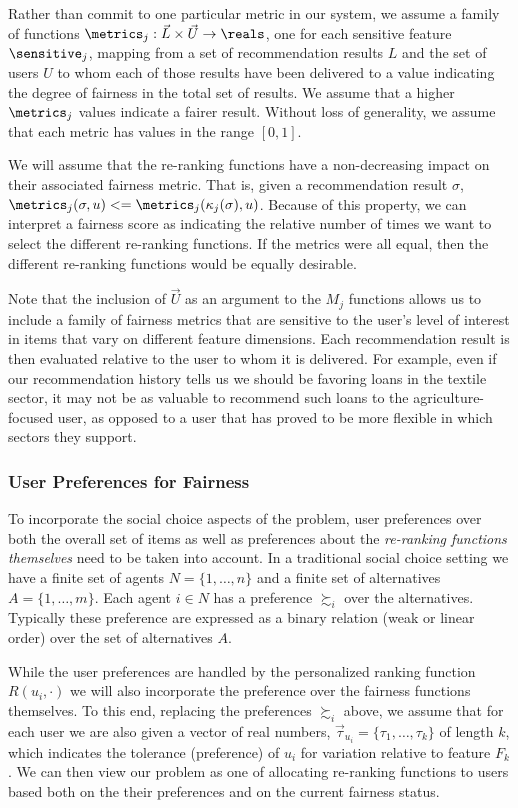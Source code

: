 Rather than commit to one particular metric in our system, we assume a family of functions $\metrics_j: \vec{L} \times \vec{U} \rightarrow \reals$, one for each sensitive feature $\sensitive_j$, mapping from a set of recommendation results $L$ and the set of users $U$ to whom each of those results have been delivered to a value indicating the degree of fairness in the total set of results. We assume that a higher $\metrics_j$ values indicate a fairer result. Without loss of generality, we assume that each metric has values in the range $[0,1]$.

We will assume that the re-ranking functions have a non-decreasing impact on their associated fairness metric. That is, given a recommendation result $\sigma$, $\metrics_j(\sigma, u) <=  \metrics_j(\kappa_j(\sigma), u)$.  Because of this property, we can interpret a fairness score as indicating the relative number of times we want to select the different re-ranking functions. If the metrics were all equal, then the different re-ranking functions would be equally desirable.

Note that the inclusion of $\vec{U}$ as an argument to the $M_j$ functions allows us to include a family of fairness metrics that are sensitive to the user's level of interest in items that vary on different feature dimensions. Each recommendation result is then evaluated relative to the user to whom it is delivered. For example, even if our recommendation history tells us we should be favoring loans in the textile sector, it may not be as valuable to recommend such loans to the agriculture-focused user, as opposed to a user that has proved to be more flexible in which sectors they support.

\subsubsection{User Preferences for Fairness}
To incorporate the social choice aspects of the problem, user preferences over both the overall set of items as well as preferences about the \emph{re-ranking functions themselves} need to be taken into account. In a traditional social choice setting we have a finite set of agents $N = \{1, \ldots, n\}$ and a finite set of alternatives $A = \{1, \ldots, m\}$. Each agent $i \in N$ has a preference $\succsim_i$ over the alternatives. Typically these preference are expressed as a binary relation (weak or linear order) over the set of alternatives $A$.  

While the user preferences are handled by the personalized ranking function $R(u_i, \cdot)$ we will also incorporate the preference over the fairness functions themselves. To this end, replacing the preferences $\succsim_i$ above, we assume that for each user we are also given a vector of real numbers, $\vec{\tau}_{u_i} = \{\tau_1, \ldots, \tau_k\}$ of length $k$, which indicates the tolerance (preference) of $u_i$ for variation relative to feature $F_k$.  We can then view our problem as one of allocating re-ranking functions to users based both on the their preferences and on the current fairness status.
 

